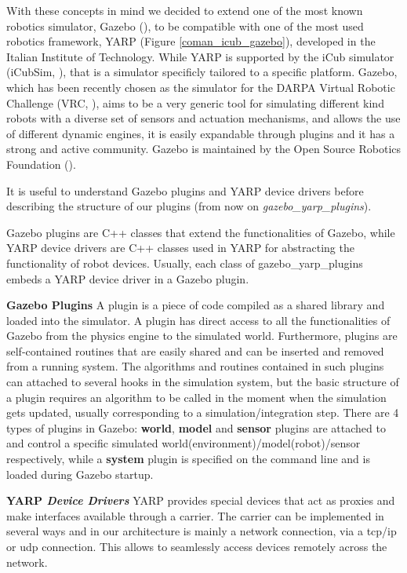 With these concepts in mind we decided to extend one of the most known robotics simulator, Gazebo (\cite{koenig2004design}), to be compatible with one of the most used robotics framework, YARP (Figure \ref{coman_icub_gazebo}), developed in the Italian Institute of Technology. 
While YARP is supported by the iCub simulator (iCubSim, \cite{Tikhanoff:2008:OSC:1774674.1774684}), that is a simulator specificly tailored to a specific platform. 
Gazebo, which has been recently chosen as the simulator for the DARPA Virtual Robotic Challenge (VRC, \cite{DRC}), aims to be a very generic tool for simulating different kind robots with a diverse set of sensors and actuation mechanisms, and allows the use of different dynamic engines, it is easily expandable through plugins and it has a strong and active community. Gazebo is maintained by the Open Source Robotics Foundation (\cite{OSRF}).

\label{structure}
It is useful to understand Gazebo plugins and YARP device drivers before describing the structure of our plugins (from now on \emph{gazebo\_yarp\_plugins}).

Gazebo plugins are C++ classes that extend the functionalities of Gazebo, while YARP device drivers are C++ classes used in YARP for abstracting the functionality of robot devices.
Usually, each class of gazebo\_yarp\_plugins embeds a YARP device driver in a Gazebo plugin. 

{\bf Gazebo Plugins}
A plugin is a piece of code compiled as a shared library and loaded into the simulator. A plugin has direct access to all the functionalities of Gazebo from the physics engine to the simulated world. Furthermore, plugins are self-contained routines that are easily shared and can be inserted and removed from a running system. The algorithms and routines contained in such plugins can attached to several hooks in the simulation system, but the basic structure of a plugin requires an algorithm to be called in the moment when the simulation gets updated, usually corresponding to a simulation/integration step. There are 4 types of plugins in Gazebo: \textbf{world}, \textbf{model} and \textbf{sensor} plugins are attached to and control a specific simulated world(environment)/model(robot)/sensor respectively, while a \textbf{system} plugin is specified on the command line and is loaded during Gazebo startup.


{\bf YARP \emph{Device Drivers}}
YARP provides special devices that act as proxies and make interfaces available through a carrier. The carrier can be implemented in several ways and in our architecture is mainly a network connection, via a tcp/ip or udp connection. This allows to seamlessly access devices remotely across the network.

